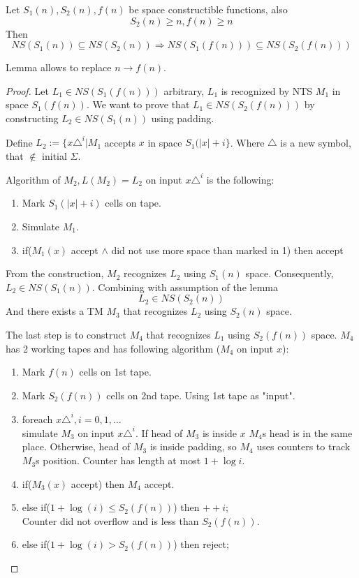 \begin{lemma}\label{transl_space}
	Let $S_1(n), S_2(n), f(n)$ be space constructible functions, also
	\[ S_2(n) \geq n, f(n) \geq n \]
	Then
	\[ NS(S_1(n)) \subseteq NS(S_2(n)) \Rightarrow NS(S_1(f(n))) \subseteq NS(S_2(f(n))) \]

	Lemma allows to replace $n \to f(n)$.
\end{lemma}
\begin{proof}
	Let $L_1 \in NS(S_1(f(n)))$ arbitrary, $L_1$ is recognized by NTS $M_1$ in space $S_1(f(n))$.
	We want to prove that $L_1 \in NS(S_2(f(n)))$ by constructing $L_2 \in NS(S_1(n))$ using padding.

	Define $L_2 := \{ x\triangle^i | M_1 $ accepts $x$ in space $S_1(|x| + i \} $.
	Where $\triangle$ is a new symbol, that $\notin $ initial $\Sigma$.

	Algorithm of $M_2, L(M_2) = L_2$ on input $x\triangle^i$ is the following:
\begin{enumerate}
	\item Mark $S_1(|x| + i)$ cells on tape.
	\item Simulate $M_1$.
	\item if($M_1(x)$ accept $\land$ did not use more space than marked in 1) then accept
\end{enumerate}
	From the construction, $M_2$ recognizes $L_2$ using $S_1(n)$ space.
	Consequently, $L_2 \in NS(S_1(n))$.
	Combining with assumption of the lemma
	\[ L_2 \in NS(S_2(n)) \]
	And there exists a TM $M_3$ that recognizes $L_2$ using $S_2(n)$ space.

	The last step is to construct $M_4$ that recognizes $L_1$ using $S_2(f(n))$ space.
	$M_4$ has 2 working tapes and has following algorithm ($M_4$ on input $x$):
\begin{enumerate}
	\item Mark $f(n)$ cells on 1st tape.
	\item Mark $S_2(f(n))$ cells on 2nd tape. Using 1st tape as "input".
	\item foreach $x\triangle^i, i = 0, 1, \ldots $ \\
		simulate $M_3$ on input $x\triangle^i$.
		If head of $M_3$ is inside $x$ $M_4$s head is in the same place.
		Otherwise, head of $M_3$ is inside padding, so $M_4$ uses counters to track $M_3$s position.
		Counter has length at most $1 + \log i$.
	\item if($M_3(x)$ accept) then $M_4$ accept.
	\item else if($1 + \log(i) \leq S_2(f(n))$) then $++i$; \\
		Counter did not overflow and is less than $S_2(f(n))$.
	\item else if($1 + \log(i) > S_2(f(n))$) then reject;
\end{enumerate}


\end{proof}
